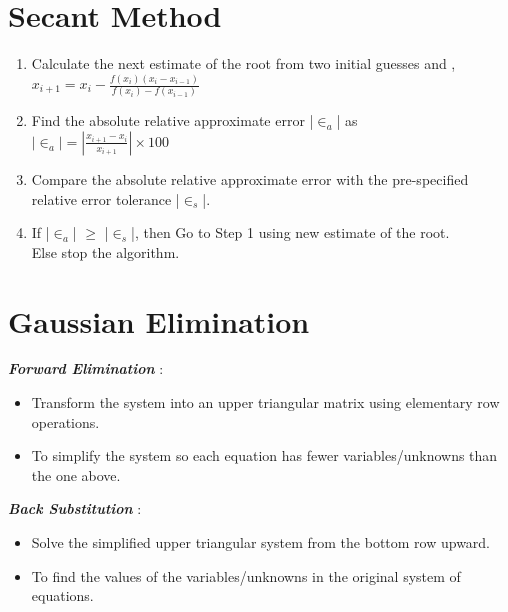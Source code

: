 \section*{Secant Method}
\begin{enumerate}[label=\textbf{\textit{Step-\arabic*}} :, left=0pt, itemindent=0pt, parsep=0.5em]
   \item Calculate the next estimate of the root from two initial guesses  and ,\\[0.5em]
   $x_{i+1} = x_i - \frac{f(x_i)(x_i - x_{i-1})}{f(x_i) - f(x_{i-1})}$
   \vspace{0.2em}
   \item Find the absolute relative approximate error |$\in_{a}$| as \\[0.5em]
   $|\in_{a}| = \left| \frac{x_{i+1} - x_i}{x_{i+1}} \right| \times 100$
   \vspace{0.2em}
   \item Compare the absolute relative approximate error with the pre-specified relative error tolerance |$\in_{s}$|.
   \item If |$\in_{a}$| $\geq$ |$\in_{s}$|, then Go to Step 1 using new
   estimate of the root.\\
   Else stop the algorithm.
\end{enumerate}

\section*{Gaussian Elimination}
\textbf{\textit{Forward Elimination}} :
\vspace{-0.5\baselineskip}
\begin{itemize}[parsep=0.25em]
   \item Transform the system into an upper triangular matrix using elementary row operations.
   \item To simplify the system so each equation has fewer variables/unknowns than the one above.
\end{itemize}

\textbf{\textit{Back Substitution}} :
\vspace{-0.5\baselineskip}
\begin{itemize}[parsep=0.25em]
   \item Solve the simplified upper triangular system from the bottom row upward.
   \item To find the values of the variables/unknowns in the original system of equations.
\end{itemize}


